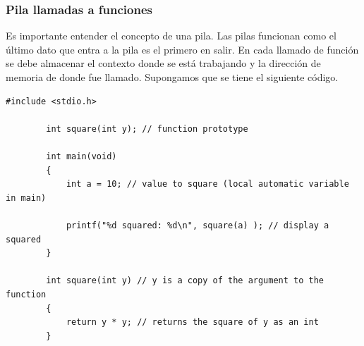 \documentclass[10.5pt,scale=1.0,t,aspectratio=169,hyperref={pdfpagelabels=false}]{beamer}
\begin{document}
\begin{frame}[fragile]
	\frametitle{Pila llamadas a funciones}
	Es importante entender el concepto de una pila. Las pilas funcionan como el último dato que entra a la pila es el primero en salir. En cada llamado de función se debe almacenar el contexto donde se está trabajando y la dirección de memoria de donde fue llamado. Supongamos que se tiene el siguiente código.
	
	\begin{lstlisting}[style=CStyle]
		#include <stdio.h>
		
		int square(int y); // function prototype
		
		int main(void)
		{
			int a = 10; // value to square (local automatic variable in main)
			
			printf("%d squared: %d\n", square(a) ); // display a squared
		}
		
		int square(int y) // y is a copy of the argument to the function
		{
			return y * y; // returns the square of y as an int
		}
	\end{lstlisting}
\end{frame}
\end{document}
